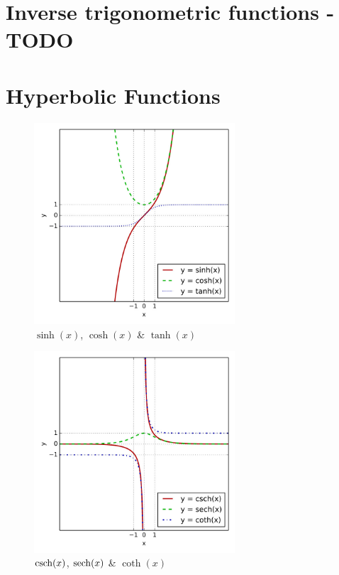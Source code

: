 \section{Inverse trigonometric functions - TODO \cite{wiki-Inverse_trigonometric_functions}}\label{Inverse trigonometric functions}

\section{Hyperbolic Functions \cite{wiki-Hyperbolic_functions}}\label{Hyperbolic functions}


\begin{table}[H]
    \centering
    \begin{minipage}[t]{0.45\linewidth}
        \begin{figure}[H]
            \centering
            \includegraphics[height=7.5cm]{Pictures/maths/Sinh_cosh_tanh.jpg}
            \caption{$\sinh(x)$, $\cosh(x)$ \& $\tanh(x)$}
        \end{figure}        
    \end{minipage}
    \hfill
    \begin{minipage}[t]{0.45\linewidth}
        \begin{figure}[H]
            \centering
            \includegraphics[height=7.5cm]{Pictures/maths/Csch_sech_coth.jpg}
            \caption{$\operatorname{csch}(x)$, $\operatorname{sech}(x)$ \& $\coth(x)$}
        \end{figure}
    \end{minipage}
\end{table}

